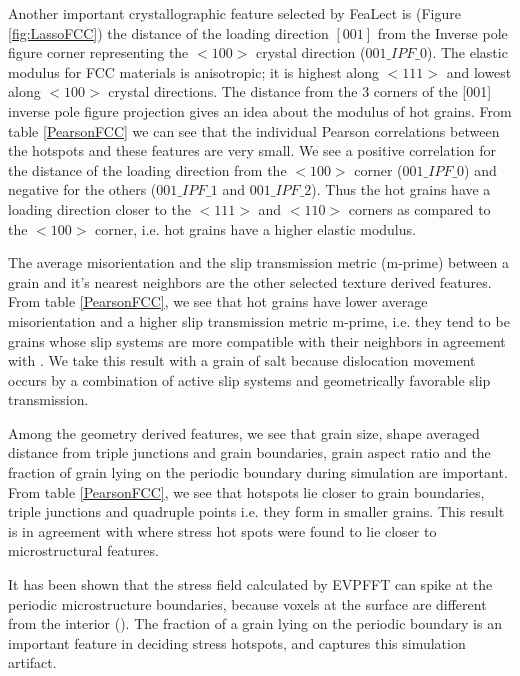 \documentclass[preprint,1p,times,authoryear]{elsarticle}%
\begin{document}
Another important crystallographic feature selected by FeaLect is (Figure \ref{fig:LassoFCC}) the distance of the loading direction $[001]$ from the Inverse pole figure corner representing the $<100>$ crystal direction ($001\_IPF\_0$). The elastic modulus for FCC materials is anisotropic; it is highest along $<111>$ and lowest along $<100>$ crystal directions. The distance from the 3 corners of the [001] inverse pole figure projection gives an idea about the modulus of hot grains.  From table \ref{PearsonFCC} we can see that the individual Pearson correlations between the hotspots and these features are very small. We see a positive correlation for the distance of the loading direction from the $<100>$ corner ($001\_IPF\_0$) and negative for the others ($001\_IPF\_1$ and $001\_IPF\_2$). Thus the hot grains have a loading direction closer to the $<111>$ and $<110>$ corners as compared to the $<100>$ corner, i.e. hot grains have a higher elastic modulus.

The average misorientation and the slip transmission metric (m-prime) between a grain and it's nearest neighbors are the other selected texture derived features. From table \ref{PearsonFCC}, we see that hot grains have lower average misorientation and a higher slip transmission metric m-prime, i.e. they tend to be grains whose slip systems are more compatible with their neighbors in agreement with \cite{Plasticity2017}. We take this result with a grain of salt because dislocation movement occurs by a combination of active slip systems and geometrically favorable slip transmission.

Among the geometry derived features, we see that grain size, shape averaged distance from triple junctions and grain boundaries, grain aspect ratio and the fraction of grain lying on the periodic boundary during simulation are important. From table \ref{PearsonFCC}, we see that hotspots lie closer to grain boundaries, triple junctions and quadruple points i.e. they form in smaller grains. This result is in agreement with \cite{Rollett2010a} where stress hot spots were found to lie closer to microstructural features. 

It has been shown that the stress field calculated by EVPFFT can spike at the periodic microstructure boundaries, because voxels at the surface are different from the interior (\cite{Anglin2014}). The fraction of a grain lying on the periodic boundary is an important feature in deciding stress hotspots, and captures this simulation artifact. 
\end{document}
